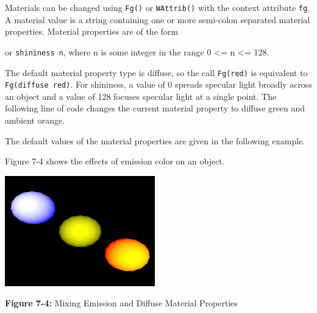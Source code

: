 Materials can be changed using \texttt{Fg()} or \texttt{WAttrib()}
with the context attribute \texttt{fg}. A material value is a string
containing one or more
semi-colon separated material properties. Material properties are of
the form


\noindent
or \texttt{{\textquotedbl}shininess n{\textquotedbl}}, where n is some integer
in the range 0 {\textless}= n {\textless}= 128.

The default material property type is diffuse, so the call
\texttt{Fg({\textquotedbl}red{\textquotedbl})} is equivalent to
\texttt{Fg({\textquotedbl}diffuse red{\textquotedbl})}. For shininess, a value
of 0 spreads specular light broadly across an object and a value of 128
focuses specular light at a single point. The following line of code
changes the current material property to diffuse green and ambient
orange. 


\noindent The default values of the material properties are given in the
following example. 


\noindent Figure 7-4 shows the effects of emission color on an object. 


\begin{center}
{\centering 
\includegraphics[width=2.5583in,height=1.8835in]{ub-img/ub-img34.png}
}

{\sffamily\bfseries Figure 7-4:}
{\sffamily Mixing Emission and Diffuse Material Properties}
\end{center}

\bigskip


